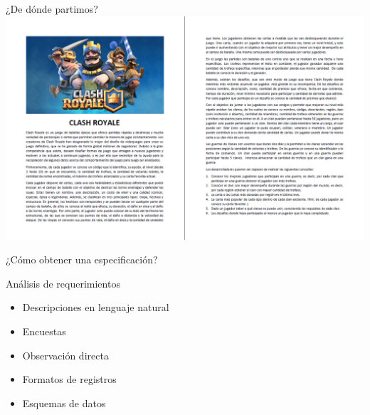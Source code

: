 \begin{frame}{¿De d\'onde partimos?}
    \centering
    \includegraphics[width=0.8\linewidth, height=0.8\textheight]{img/specs.png}
\end{frame}

\begin{frame}{¿C\'omo obtener una especificaci\'on?}
    \begin{block}{An\'alisis de requerimientos}
        \begin{itemize}
            \item Descripciones en lenguaje natural
            \item Encuestas
            \item Observaci\'on directa 
            \item Formatos de registros
            \item Esquemas de datos
        \end{itemize}
    \end{block}
\end{frame}